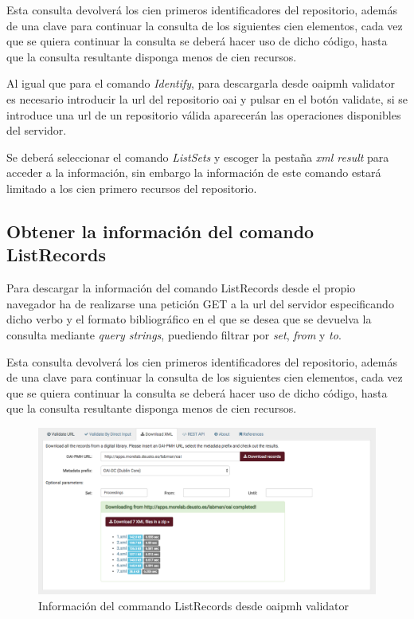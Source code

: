 Esta consulta devolverá los cien primeros identificadores del repositorio, además de una clave para continuar la consulta de los siguientes cien elementos, cada vez que se quiera continuar la consulta se deberá hacer uso de dicho código, hasta que la consulta resultante disponga menos de cien recursos. 

Al igual que para el comando \textit{Identify}, para descargarla desde \acrshort{oaipmh} validator es necesario introducir la \acrshort{url} del repositorio \acrshort{oai} y pulsar en el botón validate, si se introduce una \acrshort{url} de un repositorio válida aparecerán las operaciones disponibles del servidor.

Se deberá seleccionar el comando \textit{ListSets} y escoger la pestaña \textit{\acrshort{xml} result} para acceder a la información, sin embargo la información de este comando estará limitado a los cien primero recursos del repositorio.

\subsection{Obtener la información del comando ListRecords}

Para descargar la información del comando ListRecords desde el propio navegador ha de realizarse una petición GET a la \acrshort{url} del servidor especificando dicho verbo y el formato bibliográfico en el que se desea que se devuelva la consulta mediante \textit{query strings}, puediendo filtrar por \textit{set}, \textit{from} y \textit{to}.

Esta consulta devolverá los cien primeros identificadores del repositorio, además de una clave para continuar la consulta de los siguientes cien elementos, cada vez que se quiera continuar la consulta se deberá hacer uso de dicho código, hasta que la consulta resultante disponga menos de cien recursos.

\begin{figure}[!htbp]
	\centering
	\includegraphics[scale=0.31]{fig/download_oai/download_listrecords}
	\caption{Información del commando ListRecords desde \acrshort{oaipmh} validator}
	\label{fig:download_listrecords}
\end{figure}

